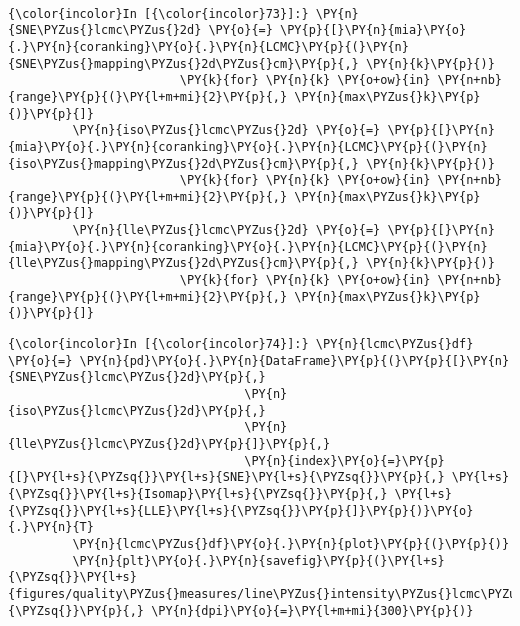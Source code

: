     \begin{center}
    \end{center}
    { \hspace*{\fill} \\}

    \begin{Verbatim}[commandchars=\\\{\}]
{\color{incolor}In [{\color{incolor}73}]:} \PY{n}{SNE\PYZus{}lcmc\PYZus{}2d} \PY{o}{=} \PY{p}{[}\PY{n}{mia}\PY{o}{.}\PY{n}{coranking}\PY{o}{.}\PY{n}{LCMC}\PY{p}{(}\PY{n}{SNE\PYZus{}mapping\PYZus{}2d\PYZus{}cm}\PY{p}{,} \PY{n}{k}\PY{p}{)}
                        \PY{k}{for} \PY{n}{k} \PY{o+ow}{in} \PY{n+nb}{range}\PY{p}{(}\PY{l+m+mi}{2}\PY{p}{,} \PY{n}{max\PYZus{}k}\PY{p}{)}\PY{p}{]}
         \PY{n}{iso\PYZus{}lcmc\PYZus{}2d} \PY{o}{=} \PY{p}{[}\PY{n}{mia}\PY{o}{.}\PY{n}{coranking}\PY{o}{.}\PY{n}{LCMC}\PY{p}{(}\PY{n}{iso\PYZus{}mapping\PYZus{}2d\PYZus{}cm}\PY{p}{,} \PY{n}{k}\PY{p}{)}
                        \PY{k}{for} \PY{n}{k} \PY{o+ow}{in} \PY{n+nb}{range}\PY{p}{(}\PY{l+m+mi}{2}\PY{p}{,} \PY{n}{max\PYZus{}k}\PY{p}{)}\PY{p}{]}
         \PY{n}{lle\PYZus{}lcmc\PYZus{}2d} \PY{o}{=} \PY{p}{[}\PY{n}{mia}\PY{o}{.}\PY{n}{coranking}\PY{o}{.}\PY{n}{LCMC}\PY{p}{(}\PY{n}{lle\PYZus{}mapping\PYZus{}2d\PYZus{}cm}\PY{p}{,} \PY{n}{k}\PY{p}{)}
                        \PY{k}{for} \PY{n}{k} \PY{o+ow}{in} \PY{n+nb}{range}\PY{p}{(}\PY{l+m+mi}{2}\PY{p}{,} \PY{n}{max\PYZus{}k}\PY{p}{)}\PY{p}{]}
\end{Verbatim}

    \begin{Verbatim}[commandchars=\\\{\}]
{\color{incolor}In [{\color{incolor}74}]:} \PY{n}{lcmc\PYZus{}df} \PY{o}{=} \PY{n}{pd}\PY{o}{.}\PY{n}{DataFrame}\PY{p}{(}\PY{p}{[}\PY{n}{SNE\PYZus{}lcmc\PYZus{}2d}\PY{p}{,}
                                 \PY{n}{iso\PYZus{}lcmc\PYZus{}2d}\PY{p}{,}
                                 \PY{n}{lle\PYZus{}lcmc\PYZus{}2d}\PY{p}{]}\PY{p}{,}
                                 \PY{n}{index}\PY{o}{=}\PY{p}{[}\PY{l+s}{\PYZsq{}}\PY{l+s}{SNE}\PY{l+s}{\PYZsq{}}\PY{p}{,} \PY{l+s}{\PYZsq{}}\PY{l+s}{Isomap}\PY{l+s}{\PYZsq{}}\PY{p}{,} \PY{l+s}{\PYZsq{}}\PY{l+s}{LLE}\PY{l+s}{\PYZsq{}}\PY{p}{]}\PY{p}{)}\PY{o}{.}\PY{n}{T}
         \PY{n}{lcmc\PYZus{}df}\PY{o}{.}\PY{n}{plot}\PY{p}{(}\PY{p}{)}
         \PY{n}{plt}\PY{o}{.}\PY{n}{savefig}\PY{p}{(}\PY{l+s}{\PYZsq{}}\PY{l+s}{figures/quality\PYZus{}measures/line\PYZus{}intensity\PYZus{}lcmc\PYZus{}2d.png}\PY{l+s}{\PYZsq{}}\PY{p}{,} \PY{n}{dpi}\PY{o}{=}\PY{l+m+mi}{300}\PY{p}{)}
\end{Verbatim}

